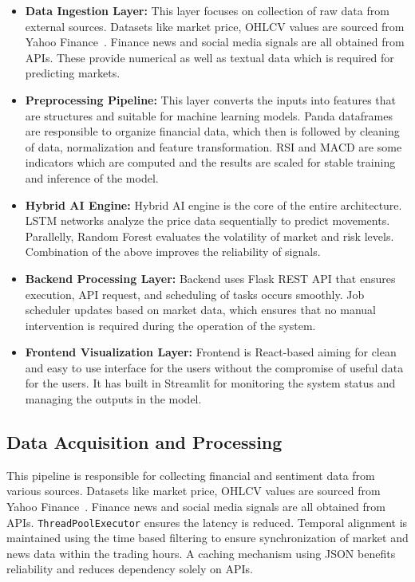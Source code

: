 \documentclass[twocolumn]{article}
\begin{document}
\begin{itemize}

\item \textbf{Data Ingestion Layer:}  
This layer focuses on collection of raw data from external sources. Datasets like market price, OHLCV values are sourced from Yahoo Finance~\cite{yahoofinance2024}. Finance news and social media signals are all obtained from APIs. These provide numerical as well as textual data which is required for predicting markets.

\item \textbf{Preprocessing Pipeline:}  
This layer converts the inputs into features that are structures and suitable for machine learning models. Panda dataframes are responsible to organize financial data, which then is followed by cleaning of data, normalization and feature transformation. RSI and MACD are some indicators which are computed and the results are scaled for stable training and inference of the model.

\item \textbf{Hybrid AI Engine:}  
Hybrid AI engine is the core of the entire architecture. LSTM networks analyze the price data sequentially to predict movements. Parallelly, Random Forest evaluates the volatility of market and risk levels. Combination of the above improves the reliability of signals.

\item \textbf{Backend Processing Layer:}  
Backend uses Flask REST API that ensures execution, API request, and scheduling of tasks occurs smoothly. Job scheduler updates based on market data, which ensures that no manual intervention is required during the operation of the system.

\item \textbf{Frontend Visualization Layer:}  
Frontend is React-based aiming for clean and easy to use interface for the users without the compromise of useful data for the users. It has built in Streamlit for monitoring the system status and managing the outputs in the model.

\end{itemize}


\subsection{Data Acquisition and Processing}

This pipeline is responsible for collecting financial and sentiment data from various sources. Datasets like market price, OHLCV values are sourced from Yahoo Finance~\cite{yahoofinance2024}. Finance news and social media signals are all obtained from APIs. \texttt{ThreadPoolExecutor} ensures the latency is reduced. Temporal alignment is maintained using the time based filtering to ensure synchronization of market and news data within the trading hours. A caching mechanism using JSON benefits reliability and reduces dependency solely on APIs.
\end{document}
